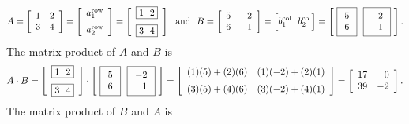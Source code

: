 \begin{equation}
\label{eq:Example3}
  A=\left[\begin{array}{cc} 1 & 2 \\
3 & 4  \end{array}\right]  =   \left[\begin{array}{c} a_1^{\rm row} \medskip\\
a_2^{\rm row} \end{array}\right]  = \left[\begin{array}{c}\boxed{ 1 ~~ 2} \medskip \\
\boxed{3 ~~ 4 }\end{array}\right] ~~
\text{and}~~
    B=\left[\begin{array}{cr} 5 & -2 \\ 6 & 1
\end{array}\right] = \Big[ b^{\rm col}_1 ~~  b^{\rm col}_2\Big] = \left[~\boxed{\begin{array}{c} 5 \\ 6\end{array} }~~\boxed{\begin{array}{r} -2 \\ 1\end{array} }~ \right].
\end{equation}
The matrix product of $A$ and $B$ is
\begin{equation}
   A \cdot B= \left[\begin{array}{c}\boxed{ 1 ~~ 2} \medskip \\
\boxed{3 ~~ 4 }\end{array}\right]  \cdot \left[~\boxed{\begin{array}{c} 5 \\ 6\end{array} }~~\boxed{\begin{array}{r} -2 \\ 1\end{array} }~ \right] =\left[\begin{array}{cc} (1)(5)+(2)(6) & (1)(-2)+(2)(1) \medskip \\
(3)(5)+(4)(6) & (3)(-2)+(4)(1)  \end{array}\right]  =\left[\begin{array}{rr} 17 & 0 \\
39 & -2  \end{array}\right].
\end{equation}
The matrix product of $B$ and $A$ is
